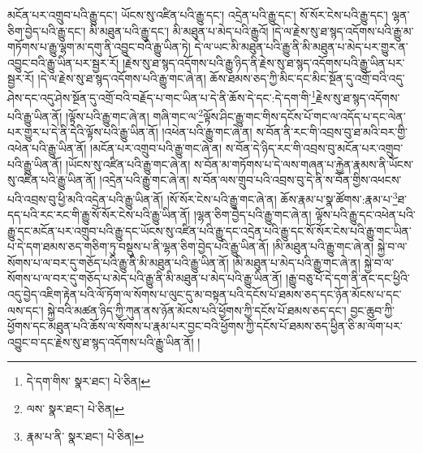 མངོན་པར་འགྲུབ་པའི་རྒྱུ་དང་། ཡོངས་སུ་འཛིན་པའི་རྒྱུ་དང་། འདྲེན་པའི་རྒྱུ་དང་། སོ་སོར་ངེས་པའི་རྒྱུ་དང་། ལྷན་ཅིག་བྱེད་པའི་རྒྱུ་དང་། མི་མཐུན་པའི་རྒྱུ་དང་། མི་མཐུན་པ་མེད་པའི་རྒྱུའོ། །དེ་ལ་རྗེས་སུ་ཐ་སྙད་འདོགས་པའི་རྒྱུ་མ་གཏོགས་པ་རྒྱུ་ལྷག་མ་དགུ་ནི་འབྱུང་བའི་རྒྱུ་ཡིན་ཏེ། དེ་ལ་ཡང་མི་མཐུན་པའི་རྒྱུ་ནི་མི་མཐུན་པ་མེད་པར་གྱུར་ན་འབྱུང་བའི་རྒྱུ་ཡིན་པར་སྦྱར་རོ། །རྗེས་སུ་ཐ་སྙད་འདོགས་པའི་རྒྱུ་ཉིད་ནི་རྗེས་སུ་ཐ་སྙད་འདོགས་པའི་རྒྱུ་ཡིན་པར་སྦྱར་རོ། །དེ་ལ་རྗེས་སུ་ཐ་སྙད་འདོགས་པའི་རྒྱུ་གང་ཞེ་ན། ཆོས་ཐམས་ཅད་ཀྱི་མིང་དང་མིང་སྔོན་དུ་འགྲོ་བའི་འདུ་ཤེས་དང་འདུ་ཤེས་སྔོན་དུ་འགྲོ་བའི་བརྗོད་པ་གང་ཡིན་པ་དེ་ནི་ཆོས་དེ་དང་:དེ་དག་གི་\footnote{དེ་དག་གིས་  སྣར་ཐང་།  པེ་ཅིན། }རྗེས་སུ་ཐ་སྙད་འདོགས་པའི་རྒྱུ་ཡིན་ནོ། །ལྟོས་པའི་རྒྱུ་གང་ཞེ་ན། གཞི་གང་ལ་\footnote{ལས་  སྣར་ཐང་།  པེ་ཅིན། }ལྟོས་ཤིང་རྒྱུ་གང་གིས་དངོས་པོ་གང་ལ་འདོད་པ་དང་ལེན་པར་གྱུར་པ་དེ་ནི་དེའི་ལྟོས་པའི་རྒྱུ་ཡིན་ནོ། །འཕེན་པའི་རྒྱུ་གང་ཞེ་ན། ས་བོན་ནི་རང་གི་འབྲས་བུ་ཐ་མའི་བར་གྱི་འཕེན་པའི་རྒྱུ་ཡིན་ནོ། །མངོན་པར་འགྲུབ་པའི་རྒྱུ་གང་ཞེ་ན། ས་བོན་དེ་ཉིད་རང་གི་འབྲས་བུ་མངོན་པར་འགྲུབ་པའི་རྒྱུ་ཡིན་ནོ། །ཡོངས་སུ་འཛིན་པའི་རྒྱུ་གང་ཞེ་ན། ས་བོན་མ་གཏོགས་པ་དེ་ལས་གཞན་པ་རྐྱེན་རྣམས་ནི་ཡོངས་སུ་འཛིན་པའི་རྒྱུ་ཡིན་ནོ། །འདྲེན་པའི་རྒྱུ་གང་ཞེ་ན། ས་བོན་ལས་གྲུབ་པའི་འབྲས་བུ་དེ་ནི་ས་བོན་གྱིས་འཕངས་པའི་འབྲས་བུ་ཕྱི་མའི་འདྲེན་པའི་རྒྱུ་ཡིན་ནོ། །སོ་སོར་ངེས་པའི་རྒྱུ་གང་ཞེ་ན། ཆོས་རྣམ་པ་སྣ་ཚོགས་:རྣམ་པ་\footnote{རྣམ་པ་ནི་  སྣར་ཐང་།  པེ་ཅིན། }ཐ་དད་པའི་རང་རང་གི་རྒྱུ་སོ་སོར་ངེས་པའི་རྒྱུ་ཡིན་ནོ། །ལྷན་ཅིག་བྱེད་པའི་རྒྱུ་གང་ཞེ་ན། ལྟོས་པའི་རྒྱུ་དང་འཕེན་པའི་རྒྱུ་དང་མངོན་པར་འགྲུབ་པའི་རྒྱུ་དང་ཡོངས་སུ་འཛིན་པའི་རྒྱུ་དང་འདྲེན་པའི་རྒྱུ་དང་སོ་སོར་ངེས་པའི་རྒྱུ་གང་ཡིན་པ་དེ་དག་ཐམས་ཅད་གཅིག་ཏུ་བསྡུས་པ་ནི་ལྷན་ཅིག་བྱེད་པའི་རྒྱུ་ཡིན་ནོ། །མི་མཐུན་པའི་རྒྱུ་གང་ཞེ་ན། སྐྱེ་བ་ལ་སོགས་པ་ལ་བར་དུ་གཅོད་པའི་རྒྱུ་ནི་མི་མཐུན་པའི་རྒྱུ་ཡིན་ནོ། །མི་མཐུན་པ་མེད་པའི་རྒྱུ་གང་ཞེ་ན། སྐྱེ་བ་ལ་སོགས་པ་ལ་བར་དུ་གཅོད་པ་མེད་པའི་རྒྱུ་ནི་མི་མཐུན་པ་མེད་པའི་རྒྱུ་ཡིན་ནོ། །རྒྱུ་བཅུ་པོ་དེ་དག་ནི་ནང་དང་ཕྱིའི་འདུ་བྱེད་འཇིག་རྟེན་པའི་ལོ་ཏོག་ལ་སོགས་པ་ལུང་དུ་མ་བསྟན་པའི་དངོས་པོ་ཐམས་ཅད་དང་ཉོན་མོངས་པ་དང་ལས་དང་། སྐྱེ་བའི་མཚན་ཉིད་ཀྱི་ཀུན་ནས་ཉོན་མོངས་པའི་ཕྱོགས་ཀྱི་དངོས་པོ་ཐམས་ཅད་དང་། བྱང་ཆུབ་ཀྱི་ཕྱོགས་དང་མཐུན་པའི་ཆོས་ལ་སོགས་པ་རྣམ་པར་བྱང་བའི་ཕྱོགས་ཀྱི་དངོས་པོ་ཐམས་ཅད་ཕྱིན་ཅི་མ་ལོག་པར་འབྱུང་བ་དང་རྗེས་སུ་ཐ་སྙད་འདོགས་པའི་རྒྱུ་ཡིན་ནོ། །
